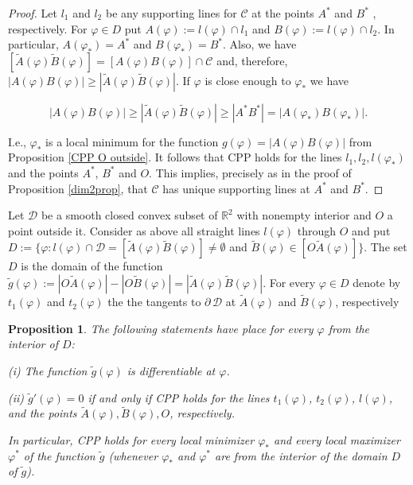 \documentclass[a4paper,12pt]{amsart}
\newtheorem{prop}[thm]{Proposition}
\begin{document}
\begin{proof}
Let  $l_1$ and $l_2$ be any supporting lines for $\mathcal C$ at
the points $A^*$ and $B^*$ , respectively. For $\varphi \in D$ put
$A(\varphi):=l(\varphi) \cap l_1$
 and
$B(\varphi):= l(\varphi) \cap l_2$. In particular, ${A}(\varphi_*) = A^*$ and ${B}(\varphi_*) = B^*$. Also,
we have $[\tilde{A}(\varphi)\tilde{B}(\varphi)]= [A(\varphi)B(\varphi)] \cap \mathcal C$ and, therefore, $ |A(\varphi)B(\varphi)| \geq |\tilde{A}(\varphi) \tilde{B}(\varphi)|  $.
If $\varphi$ is close enough to $\varphi_*$ we have

$$ |A(\varphi)B(\varphi)| \geq |\tilde{A}(\varphi) \tilde{B}(\varphi)| \geq |A^*B^*|= |A(\varphi_*)B(\varphi_*)|.$$

\noindent I.e., $\varphi_*$ is a local minimum for the function $
g(\varphi)=|{A}(\varphi) {B}(\varphi)|$ from Proposition \ref{CPP
O outside}. It follows that CPP holds for the lines $l_1, l_2,
l(\varphi_*)$  and the points $A^*$, $B^*$ and $O$.  This implies,
precisely as in the proof of Proposition \ref{dim2prop}, that
$\mathcal C$ has unique supporting lines at $A^*$ and $B^*$.
\end{proof}

Let $\mathcal D$ be a smooth closed convex subset of
$\mathbb{R}^2$ with nonempty interior and $O$ a point outside it.
Consider as above  all straight lines $l(\varphi)$ through $O$ and
put  $D :=\{\varphi: l(\varphi) \cap \mathcal D  =
[\tilde{A}(\varphi)\tilde{B}(\varphi)] \not = \emptyset$ and
$\tilde{B}(\varphi) \in [O\tilde{A}(\varphi)] \}$.
  The set $D$ is the domain of the function
 $\tilde{g}(\varphi):= |O \tilde{A}(\varphi)| - |O\tilde{B}(\varphi)| = |\tilde{A}(\varphi) \tilde{B}(\varphi)|.$
 For every $\varphi \in D$  denote by $t_1(\varphi)$ and $t_2(\varphi)$
 the the tangents to $\partial \,\mathcal D$ at $\tilde{A}(\varphi)$ and $\tilde{B}(\varphi)$, respectively

\begin{prop} \label{max O outside}
The following statements have place for every $\varphi$ from the interior of $D$:

 (i) The function $\tilde{g}(\varphi)$ is differentiable at $\varphi$.

 (ii) $\tilde{g}'(\varphi)=0$ if and only if
  CPP holds for the lines $t_1(\varphi)$, $t_2(\varphi)$, $l(\varphi)$, and the points $\tilde{A}(\varphi), \tilde{B}(\varphi), O$, respectively.

  In particular, CPP holds for every local minimizer $\varphi_*$ and every local maximizer $\varphi^*$ of the function $\tilde{g}$
(whenever $\varphi_*$ and $\varphi^*$ are from the interior of the domain $D$ of $\tilde{g}$).

\end{prop}
\end{document}
